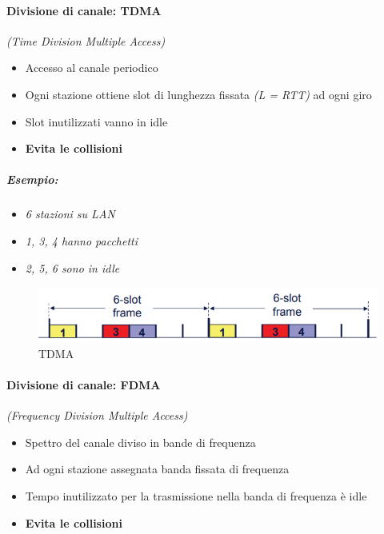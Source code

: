 \documentclass[12pt]{article}
\begin{document}
    \paragraph{Divisione di canale: TDMA}  \textit{(Time Division Multiple Access)}
    \begin{itemize}
        \item Accesso al canale periodico
        \item Ogni stazione ottiene slot di lunghezza fissata \textit{(L = RTT)} ad ogni giro
        \item Slot inutilizzati vanno in idle
        \item \textbf{Evita le collisioni}
    \end{itemize}

    \subparagraph{\textit{Esempio:}}
    \begin{itemize}
        \item \textit{6 stazioni su LAN}
        \item \textit{1, 3, 4 hanno pacchetti}
        \item \textit{2, 5, 6 sono in idle}
    \end{itemize}
    \begin{figure}[!htb]
        \centering
        \includegraphics[width=1\textwidth]{TDMA.PNG}
        \caption{TDMA}
    \end{figure}
    \paragraph{Divisione di canale: FDMA} \textit{(Frequency Division Multiple Access)}
    \begin{itemize}
        \item Spettro del canale diviso in bande di frequenza
        \item Ad ogni stazione assegnata banda fissata di frequenza
        \item Tempo inutilizzato per la trasmissione nella banda di frequenza è idle 
        \item \textbf{Evita le collisioni}
    \end{itemize}
\end{document}
